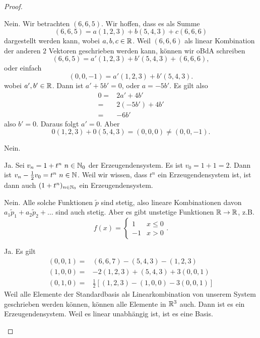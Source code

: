 \begin{proof}
	\begin{parts}
	\item Nein. Wir betrachten $(6,6,5)$. Wir hoffen, dass es als Summe
		\[
			(6,6,5)=a(1,2,3)+b(5,4,3)+c(6,6,6)
		\]
		dargestellt werden kann, wobei $a,b,c\in \mathbb{R}$. Weil $(6,6,6)$ als linear Kombination der anderen $2$ Vektoren geschrieben werden kann, können wir oBdA schreiben
		\[
			(6,6,5)=a'(1,2,3)+b'(5,4,3)+(6,6,6)
		,\]
		oder einfach
\[
	(0,0,-1)=a'(1,2,3)+b'(5,4,3)
.\] 
		wobei $a',b'\in \mathbb{R}$. Dann ist $a'+5b'=0$, oder $a=-5b'$. Es gilt also
		\begin{align*}
			0=&2a'+4b'\\
			=&2(-5b')+4b'\\
			=& -6b'
		\end{align*}
		also $b'=0$. Daraus folgt $a'=0$. Aber
		\[
		0(1,2,3)+0(5,4,3)=(0,0,0)\neq (0,0,-1)
		.\] 
	\item Nein. 
	\item Ja. Sei $v_n=1+t^n~n\in \mathbb{N}_0$ der Erzeugendensystem. Es ist $v_0=1+1=2$. Dann ist $v_n-\frac{1}{2}v_0=t^n~n\in \mathbb{N}$. Weil wir wissen, dass $t^n$ ein Erzeugendensystem ist, ist dann auch $(1+t^n)_{n\in \mathbb{N}_0}$ ein Erzeugendensystem.
	\item Nein. Alle solche Funktionen $\tilde{p}$ sind stetig, also lineare Kombinationen davon $a_1\tilde{p}_1+a_2\tilde{p}_2+\dots$ sind auch stetig. Aber es gibt unstetige Funktionen $\mathbb{R}\to \mathbb{R}$, z.B.
		\[
		f(x)=\begin{cases}
			1 & x \le 0\\
			-1 & x > 0
		\end{cases}
		.\] 
	\item Ja. Es gilt
	\begin{align*}
		(0,0,1)=&(6,6,7)-(5,4,3)-(1,2,3)\\
		(1,0,0)=&-2(1,2,3)+(5,4,3)+3(0,0,1)\\
		(0,1,0)=&\frac{1}{2}\left[ (1,2,3)-(1,0,0)-3(0,0,1) \right] 
	\end{align*}
	Weil alle Elemente der Standardbasis als Linearkombination von unserem System geschrieben werden können, können alle Elemente in $\mathbb{R}^3$ auch. Dann ist es ein Erzeugendensystem. Weil es linear unabhängig ist, ist es eine Basis.\qedhere
	\end{parts}
\end{proof}
